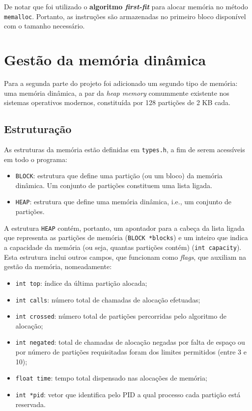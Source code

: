 \documentclass[10pt,oneside]{estiloUBI}
\begin{document}
	De notar que foi utilizado o \textbf{algoritmo \textit{first-fit}} para alocar memória no método \verb|memalloc|. Portanto, as instruções são armazenadas no primeiro bloco disponível com o tamanho necessário.
	
	
	\chapter{Gestão da memória dinâmica}
	\label{sec:heap}
	
	Para a segunda parte do projeto foi adicionado um segundo tipo de memória: uma memória dinâmica, a par da \textit{heap memory} comummente existente nos sistemas operativos modernos, constituída por 128 partições de 2 KB cada.
	
	
	\section{Estruturação}
	\label{ssec:heap:struct}
	
	As estruturas da memória estão definidas em \verb|types.h|, a fim de serem acessíveis em todo o programa:
	\begin{itemize}
		\item \verb|BLOCK|: estrutura que define uma partição (ou um bloco) da memória dinâmica. Um conjunto de partições constituem uma lista ligada.
		\item \verb|HEAP|: estrutura que define uma memória dinâmica, i.e., um conjunto de partições.
	\end{itemize}

	A estrutura \verb|HEAP| contém, portanto, um apontador para a cabeça da lista ligada que representa as partições de memória (\texttt{BLOCK *blocks}) e um inteiro que indica a capacidade da memória (ou seja, quantas partições contém) (\texttt{int capacity}). Esta estrutura inclui outros campos, que funcionam como \textit{flags}, que auxiliam na gestão da memória, nomeadamente:
	
	\begin{itemize}
		\item \texttt{int top}: índice da última partição alocada;
		\item \texttt{int calls}: número total de chamadas de alocação efetuadas;
		\item \texttt{int crossed}: número total de partições percorridas pelo algoritmo de alocação;
		\item \texttt{int negated}: total de chamadas de alocação negadas por falta de espaço ou por número de partições requisitadas foram dos limites permitidos (entre 3 e 10);
		\item \texttt{float time}: tempo total dispensado nas alocações de memória;
		\item \texttt{int *pid}: vetor que identifica pelo \ac{PID} a qual processo cada partição está reservada.
	\end{itemize}
\end{document}
